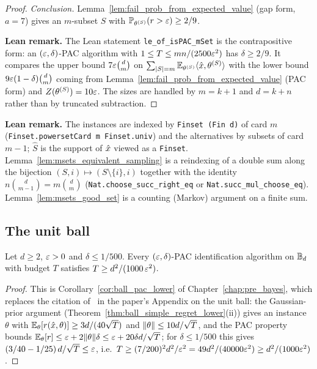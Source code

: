 \begin{proof}
\emph{Conclusion.} Lemma~\ref{lem:fail_prob_from_expected_value} (gap form, $a = 7$) gives
an $m$-subset $S$ with $\mathbb{P}_{\theta^{(S)}}(r > \varepsilon) \ge 2/9$.

\textbf{Lean remark.} The Lean statement \texttt{le\_of\_isPAC\_mSet} is the contrapositive
form: an $(\varepsilon,\delta)$-PAC algorithm with $1 \le T \le mn/(2500\varepsilon^2)$ has $\delta \ge 2/9$.
It compares the upper bound $7\varepsilon\binom dm$ on $\sum_{\lvert S \rvert = m}\mathbb{E}_{\theta^{(S)}}\langle \hat{x}, \theta^{(S)} \rangle$
with the lower bound $9\varepsilon(1-\delta)\binom dm$ coming from
Lemma~\ref{lem:fail_prob_from_expected_value} (PAC form) and
$Z(\theta^{(S)}) = 10\varepsilon$. The sizes are handled by $m = k+1$ and $d = k+n$ rather than by
truncated subtraction.
\end{proof}

\textbf{Lean remark.} The instances are indexed by \texttt{Finset (Fin d)} of card $m$
(\texttt{Finset.powersetCard m Finset.univ}) and the alternatives by subsets of card $m-1$;
$\hat S$ is the support of $\hat{x}$ viewed as a \texttt{Finset}. Lemma~\ref{lem:msets_equivalent_sampling}
is a reindexing of a double sum along the bijection $(S,i)\mapsto(S\setminus\{i\},i)$
together with the identity $n\binom{d}{m-1} = m\binom dm$ (\texttt{Nat.choose\_succ\_right\_eq}
or \texttt{Nat.succ\_mul\_choose\_eq}). Lemma~\ref{lem:msets_good_set} is a counting
(Markov) argument on a finite sum.

\subsection{The unit ball}
\label{sec:log_gains_lower_ball}

\begin{corollary}\label{cor:lower_ball_adaptive}
\leanok
{}
Let $d \ge 2$, $\varepsilon > 0$ and $\delta \le 1/500$. Every $(\varepsilon,\delta)$-PAC identification
algorithm on $\mathbb{B}_d$ with budget $T$ satisfies $T \ge d^2/(1000\,\varepsilon^2)$.
\end{corollary}

\begin{proof}
\leanok
{}
This is Corollary~\ref{cor:ball_pac_lower} of Chapter~\ref{chap:pre_bayes}, which replaces
the citation of~\cite{chen2024assouad} in the paper's Appendix on the unit ball: the
Gaussian-prior argument (Theorem~\ref{thm:ball_simple_regret_lower}(ii)) gives an instance
$\theta$ with $\mathbb{E}_\theta[r(\hat{x},\theta)] \ge 3d/(40\sqrt T)$ and
$\lVert \theta \rVert \le 10d/\sqrt T$, and the PAC property bounds
$\mathbb{E}_\theta[r] \le \varepsilon + 2\lVert \theta \rVert\delta \le \varepsilon + 20\delta d/\sqrt T$; for
$\delta \le 1/500$ this gives $(3/40 - 1/25)\,d/\sqrt T \le \varepsilon$, i.e.\
$T \ge (7/200)^2d^2/\varepsilon^2 = 49d^2/(40000\varepsilon^2) \ge d^2/(1000\varepsilon^2)$.
\end{proof}

